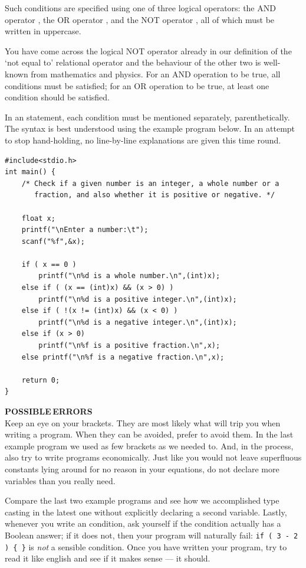 \documentclass[11pt,oneside]{article}
\newcounter{exercise}
\newcommand{\eb}[1]{\textbf{\scriptsize{\sffamily\addfontfeatures{LetterSpace=7} #1\\[.35em]}}}
\begin{document}
{{{{{{{{{Such conditions are specified using one of three logical operators: the AND operator \cbox{&&}, the OR operator \cbox{||}, and the NOT operator \cbox{!}, all of which must be written in uppercase.

You have come across the logical NOT operator already in our definition of the `not equal to' relational operator \cbox{!=} and the behaviour of the other two is well-known from mathematics and physics. For an AND operation to be true, all conditions must be satisfied; for an OR operation to be true, at least one condition should be satisfied.

In an  statement, each condition must be mentioned separately, parenthetically. The syntax  is best understood using the example program below. In an attempt to stop hand-holding, no line-by-line explanations are given this time round.
\begin{lstlisting}
#include<stdio.h>
int main() {
    /* Check if a given number is an integer, a whole number or a
       fraction, and also whether it is positive or negative. */
        
    float x;
    printf("\nEnter a number:\t");
    scanf("%f",&x);
    
    if ( x == 0 )
        printf("\n%d is a whole number.\n",(int)x);
    else if ( (x == (int)x) && (x > 0) )
        printf("\n%d is a positive integer.\n",(int)x);
    else if ( !(x != (int)x) && (x < 0) )
        printf("\n%d is a negative integer.\n",(int)x);
    else if (x > 0)
        printf("\n%f is a positive fraction.\n",x);
    else printf("\n%f is a negative fraction.\n",x);
    
    return 0;
}
\end{lstlisting}
\vspace*{-0.5cm}
\begin{errorbox}
\eb{POSSIBLE\;\,ERRORS }
Keep an eye on your brackets. They are most likely what will trip you when writing a program. When they can be avoided, prefer to avoid them. In the last example program we used as few brackets as we needed to. And, in the process, also try to write programs economically. Just like you would not leave superfluous constants lying around for no reason in your equations, do not declare more variables than you really need.

\hspace*{0.5cm}Compare the last two example programs and see how we accomplished type casting in the latest one without explicitly declaring a second variable. Lastly, whenever you write an  condition, ask yourself if the condition actually has a Boolean answer; if it does not, then your program will naturally fail: \verb+if ( 3 - 2 ) { }+ is \textit{not} a sensible condition. Once you have written your program, try to read it like english and see if it makes sense --- it should.
\end{errorbox}
\vspace*{-0.5cm}

}}}}}}}}}
\end{document}
